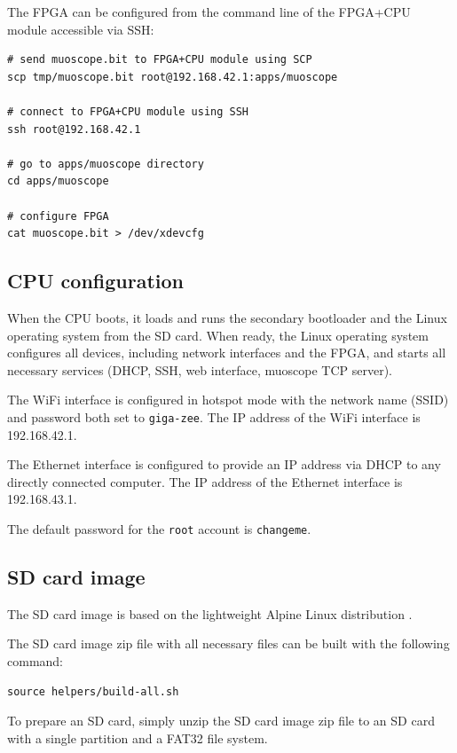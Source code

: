 \documentclass[12pt, a4paper]{article}
\begin{document}
The FPGA can be configured from the command line of the FPGA+CPU module accessible via SSH:
\vspace{-1ex}
\begin{verbatim}
# send muoscope.bit to FPGA+CPU module using SCP
scp tmp/muoscope.bit root@192.168.42.1:apps/muoscope

# connect to FPGA+CPU module using SSH
ssh root@192.168.42.1

# go to apps/muoscope directory
cd apps/muoscope

# configure FPGA
cat muoscope.bit > /dev/xdevcfg
\end{verbatim}

\subsection{CPU configuration}

When the CPU boots, it loads and runs the secondary bootloader and the Linux operating system from the SD card. When ready, the Linux operating system configures all devices, including network interfaces and the FPGA, and starts all necessary services (DHCP, SSH, web interface, muoscope TCP server).

The WiFi interface is configured in hotspot mode with the network name (SSID) and password both set to \texttt{giga-zee}. The IP address of the WiFi interface is 192.168.42.1.

The Ethernet interface is configured to provide an IP address via DHCP to any directly connected computer. The IP address of the Ethernet interface is 192.168.43.1.

The default password for the \texttt{root} account is \texttt{changeme}.

\subsection{SD card image}

The SD card image is based on the lightweight Alpine Linux distribution \cite{alpine}.

The SD card image zip file with all necessary files can be built with the following command:
\vspace{-1ex}
\begin{verbatim}
source helpers/build-all.sh
\end{verbatim}

To prepare an SD card, simply unzip the SD card image zip file to an SD card with a single partition and a FAT32 file system.
\end{document}
